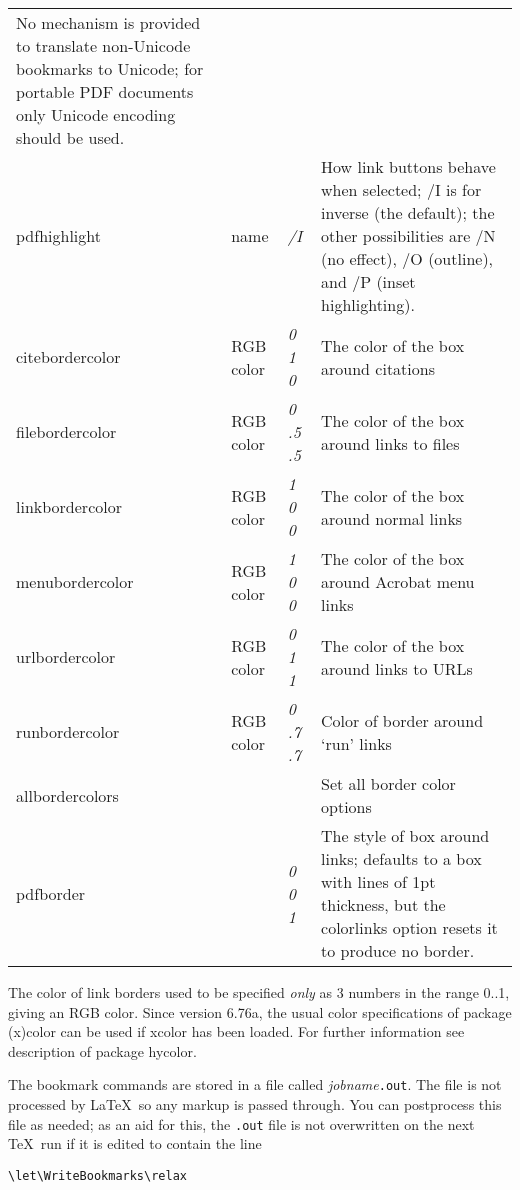 \documentclass{article}
\newcommand*{\xpackage}[1]{\textsf{#1}}
\begin{document}
\begin{longtable}{@{}>{\ttfamily}ll>{\itshape}lp{7.6cm}@{}}
    No mechanism is provided to translate non-Unicode bookmarks to
    Unicode; for portable PDF documents only Unicode encoding should
    be used.\\
pdfhighlight       & name      & /I      & How link buttons behave when selected; /I is for inverse (the default);
                                           the other possibilities are /N (no effect), /O (outline), and /P (inset
                                           highlighting). \\
citebordercolor    & RGB color & 0 1 0   & The color of the box around citations \\
filebordercolor    & RGB color & 0 .5 .5 & The color of the box around links to files \\
linkbordercolor    & RGB color & 1 0 0   & The color of the box around normal links \\
menubordercolor    & RGB color & 1 0 0   & The color of the box around Acrobat menu links \\
urlbordercolor     & RGB color & 0 1 1   & The color of the box around links to URLs \\
runbordercolor     & RGB color & 0 .7 .7 & Color of border around `run' links \\
allbordercolors    &           &         & Set all border color options \\
pdfborder          &           & 0 0 1   & The style of box around links; defaults to a box with lines of 1pt thickness,
                                           but the colorlinks option resets it to produce no border.
\end{longtable}

The color of link borders used to be specified \emph{only} as 3
numbers in the range 0..1, giving an RGB color. Since version 6.76a, the usual
color specifications of package \xpackage{(x)color} can be used if \xpackage{xcolor}
has been loaded.
For further information see description of package \xpackage{hycolor}.

The bookmark commands are stored in a file called
\textit{jobname}\texttt{.out}. The file is not processed by \LaTeX\ so
any markup is passed through. You can postprocess this file as needed;
as an aid for this, the \texttt{.out} file is not overwritten on the
next \TeX\ run if it is edited to contain the line
\begin{verbatim}
\let\WriteBookmarks\relax
\end{verbatim}
\end{document}
